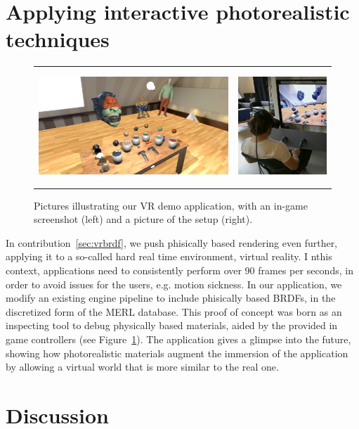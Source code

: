 \section{Applying interactive photorealistic techniques}
\begin{figure}
\centering
\begin{tabular}{@{}c@{}c@{}}
	 \includegraphics[height = 4.3cm]{figures/screen1_crop} &
		 \includegraphics[height = 4.3cm]{figures/person} \\[-2.5ex]
\end{tabular}
  \caption{Pictures illustrating our VR demo application, with an in-game screenshot (left) and a picture of the setup (right). }
  \label{fig:vrbrdfimage}
\end{figure}
In contribution~\ref{sec:vrbrdf}, we push phisically based rendering even further, applying it to a so-called hard real time environment, virtual reality. I nthis context, applications need to consistently perform over 90 frames per seconds, in order to avoid issues for the users, e.g. motion sickness. In our application, we modify an existing engine pipeline to include phisically based BRDFs, in the discretized form of the MERL database. This proof of concept was born as an inspecting tool to debug physically based materials, aided by the provided in game controllers (see Figure~\ref{fig:vrbrdfimage}). The application gives a glimpse into the future, showing how photorealistic materials augment the immersion of the application by allowing a virtual world that is more similar to the real one. 


\section{Discussion}